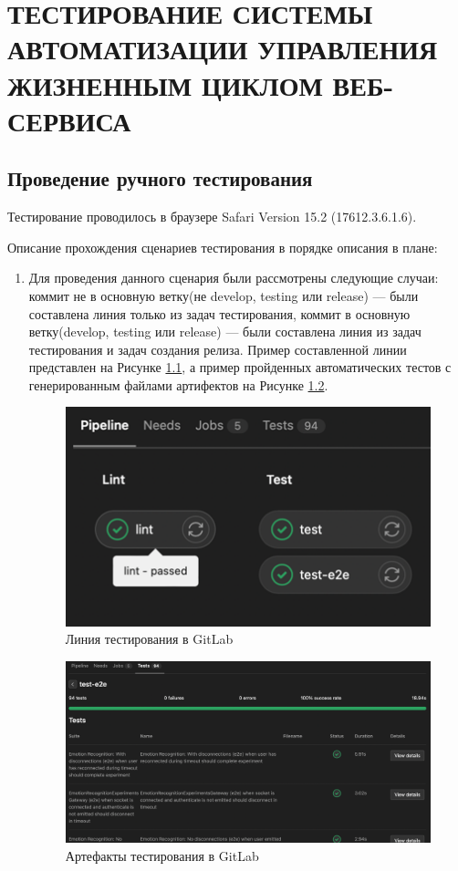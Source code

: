 \chapter{ТЕСТИРОВАНИЕ СИСТЕМЫ АВТОМАТИЗАЦИИ УПРАВЛЕНИЯ ЖИЗНЕННЫМ ЦИКЛОМ ВЕБ-СЕРВИСА}
\label{cha:research}

\section{Проведение ручного тестирования}

Тестирование проводилось в браузере Safari Version 15.2 (17612.3.6.1.6).

Описание прохождения сценариев тестирования в порядке описания в плане:

\begin{enumerate}
    \item Для проведения данного сценария были рассмотрены следующие случаи:
    коммит не в основную ветку(не develop, testing или release) --- были составлена линия только из задач тестирования,
    коммит в основную ветку(develop, testing или release) --- были составлена линия из задач тестирования и задач создания релиза.
    Пример составленной линии представлен на Рисунке \ref{fig:qa-pipeline}, а пример пройденных автоматических тестов
    с генерированным файлами артифектов на Рисунке \ref{fig:qa-artifacts}.

    \begin{figure}[ht]
        \centering
        \includegraphics[scale=0.8]{src/figures/2}
        \caption{Линия тестирования в GitLab}
        \label{fig:qa-pipeline}
    \end{figure}

    \begin{figure}[ht]
        \centering
        \includegraphics[scale=0.4]{src/figures/3}
        \caption{Артефакты тестирования в GitLab}
        \label{fig:qa-artifacts}
    \end{figure}


\end{enumerate}

